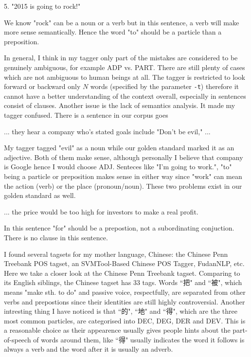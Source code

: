 \documentclass[11pt]{article} %
\begin{document}
\begin{displayquote}
  5. "2015 is going to rock!"
\end{displayquote}
We know "rock" can be a noun or a verb but in this sentence, a verb will make more sense semantically. Hence the word "to" should be a particle than a preposition.

In general, I think in my tagger only part of the mistakes are considered to be genuinely ambiguous, for example ADP vs. PART. There are still plenty of cases which are not ambiguous to human beings at all. The tagger is restricted to look forward or backward only $N$ words (specified by the parameter \texttt{-t}) therefore it cannot have a better understanding of the context overall, especially in sentences consist of clauses. Another issue is the lack of semantics analysis. It made my tagger confused. There is a sentence in our corpus goes
\begin{displayquote}
  ... they hear a company who's stated goals include "Don't be evil," ...
\end{displayquote}

My tagger tagged "evil" as a noun while our golden standard marked it as an adjective. Both of them make sense, although personally I believe that company is Google hence I would choose ADJ. Senteces like "I'm going to work.", "to" being a particle or preposition makes sense in either way since "work" can mean the action (verb) or the place (pronoun/noun). These two problems exist in our golden standard as well.
\begin{displayquote}
  ... the price would be too high for investors to make a real profit.
\end{displayquote}
In this sentence "for" should be a prepostion, not a subordinating conjuction. There is no clause in this sentence.

I found several tagsets for my mother language, Chinese: the Chinese Penn Treebank POS tagset\cite{xia2000part}, an SVMTool-Based Chinese POS Tagger\cite{王丽杰2009基于}, FudanNLP\cite{qiu2013fudannlp}, etc. Here we take a closer look at the Chinese Penn Treebank tagset. Comparing to its English siblings, the Chinese tagset has 33 tags. Words ``把" and ``被", which means "make sth. to do" and passive voice, respectfully, are separated from other verbs and prepostions since their identities are still highly controversial. Another intresting thing I have noticed is that ``的", ``地" and ``得", which are the three most common particles, are categorised into DEC, DEG, DER and DEV. This is a reasonable choice as their appearence usually gives people hints about the part-of-speech of words around them, like ``得" usually indicates the word it follows is always a verb and the word after it is usually an adverb.
\end{document}

